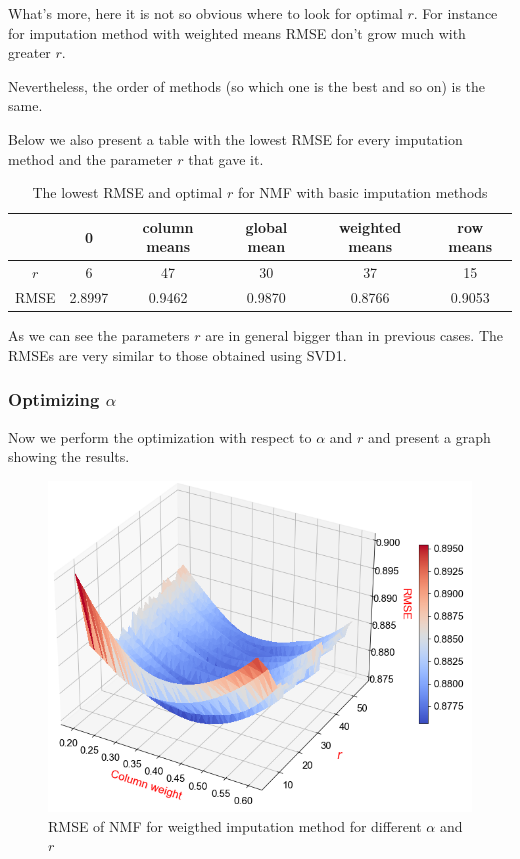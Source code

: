 \documentclass[11pt]{amsart}
\begin{document}
What's more, here it is not so obvious where to look for optimal $r$.
For instance for imputation method with weighted means RMSE don't grow much with greater $r$.

Nevertheless, the order of methods (so which one is the best and so on) is the same.

Below we also present a table with the lowest RMSE for every imputation method and the parameter $r$ that gave it.

\begin{table}[H]
\begin{tabular}{c|ccccc}
& 0 & column means & global mean & weighted means & row means \\
\hline
$r$ & 6 & 47 & 30 & 37 & 15\\
RMSE & 2.8997 & 0.9462 & 0.9870 & 0.8766 & 0.9053 \\
\end{tabular}
\caption{The lowest RMSE and optimal $r$ for NMF with basic imputation methods}
\end{table}

As we can see the parameters $r$ are in general bigger than in previous cases.
The RMSEs are very similar to those obtained using SVD1.

\subsubsection*{Optimizing $\alpha$}
Now we perform the optimization with respect to $\alpha$ and $r$ and present a graph showing the results.

\begin{figure}[H]
\includegraphics[scale = 0.6]{nmf_r_w2}
\caption{RMSE of NMF for weigthed imputation method for different $\alpha$ and $r$}
\end{figure}
\end{document}
